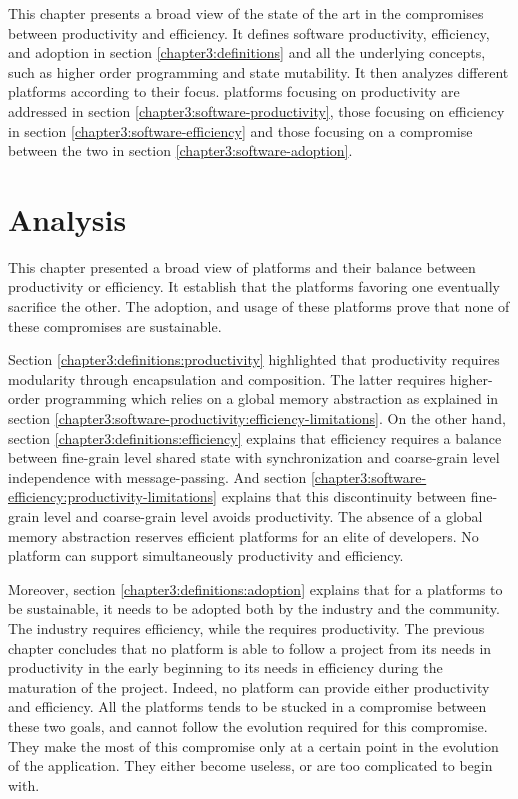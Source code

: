This chapter presents a broad view of the state of the art in the compromises between productivity and efficiency.
It defines software productivity, efficiency, and adoption in section \ref{chapter3:definitions} and all the underlying concepts, such as higher order programming and state mutability.
It then analyzes different platforms according to their focus. platforms focusing on productivity are addressed in section \ref{chapter3:software-productivity}, those focusing on efficiency in section \ref{chapter3:software-efficiency} and those focusing on a compromise between the two in section \ref{chapter3:software-adoption}.









\section{Analysis}

This chapter presented a broad view of platforms and their balance between productivity or efficiency.
It establish that the platforms favoring one eventually sacrifice the other.
The adoption, and usage of these platforms prove that none of these compromises are sustainable.

Section \ref{chapter3:definitions:productivity} highlighted that productivity requires modularity through encapsulation and composition.
The latter requires higher-order programming which relies on a global memory abstraction as explained in section \ref{chapter3:software-productivity:efficiency-limitations}.
On the other hand, section \ref{chapter3:definitions:efficiency} explains that efficiency requires a balance between fine-grain level shared state with synchronization and coarse-grain level independence with message-passing.
And section \ref{chapter3:software-efficiency:productivity-limitations} explains that this discontinuity between fine-grain level and coarse-grain level avoids productivity.
The absence of a global memory abstraction reserves efficient platforms for an elite of developers.
No platform can support simultaneously productivity and efficiency.

Moreover, section \ref{chapter3:definitions:adoption} explains that for a platforms to be sustainable, it needs to be adopted both by the industry and the community.
The industry requires efficiency, while the requires productivity.
The previous chapter concludes that no platform is able to follow a project from its needs in productivity in the early beginning to its needs in efficiency during the maturation of the project.
Indeed, no platform can provide either productivity and efficiency.
All the platforms tends to be stucked in a compromise between these two goals, and cannot follow the evolution required for this compromise.
They make the most of this compromise only at a certain point in the evolution of the application.
They either become useless, or are too complicated to begin with.

